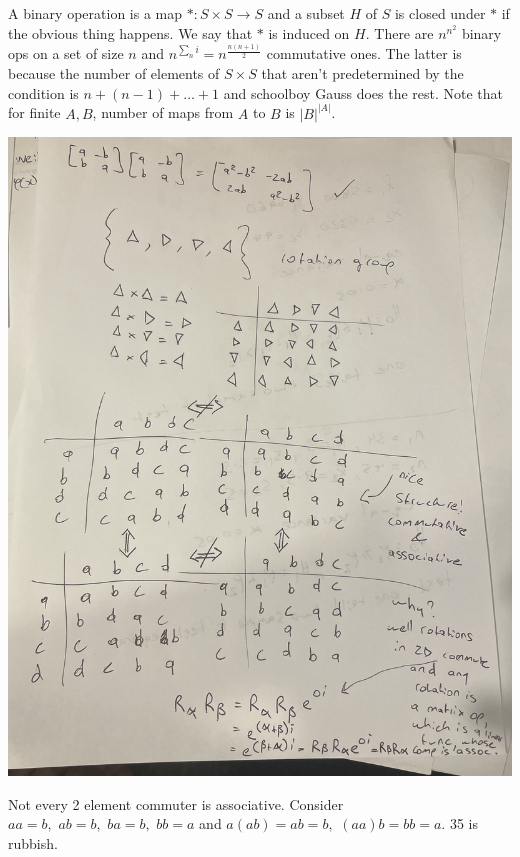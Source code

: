 \section{}
A binary operation is a map $*:S \times S \to S$ and a subset $H$ of $S$ is closed under $*$ if the obvious thing happens.
We say that $*$ is induced on $H$. There are $n^{n^2}$ binary ops on a set of size $n$ and $n^{\sum_n i} = n^{\frac{n(n+1)}{2}}$ commutative ones.
The latter is because the number of elements of $S \times S$ that aren't predetermined by the condition is $n+(n-1)+\hdots+1$ and schoolboy Gauss does the rest.
Note that for finite $A,B$, number of maps from $A$ to $B$ is $|B|^{|A|}$.
\begin{center}
\includegraphics[scale=0.1, angle=-90]{fig/IMG_7243.jpeg}
\end{center}
Not every 2 element commuter is associative. Consider $aa = b, \,\, ab=b,\,\,ba=b,\,\,bb=a$ and $a(ab) = ab=b,\,\,(aa)b=bb=a$. 35 is rubbish.
